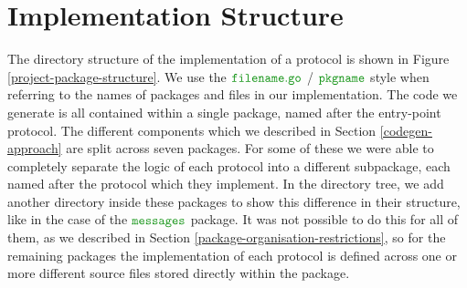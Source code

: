 \documentclass[12pt,twoside]{report}
\begin{document}


    

\section{Implementation Structure}\label{project-structure}

The directory structure of the implementation of a protocol is shown in Figure \ref{project-package-structure}. We use the $\filename{filename}$ / $\pkgname{pkgname}$ style when referring to the names of packages and files in our implementation. The code we generate is all contained within a single package, named after the entry-point protocol. The different components which we described in Section \ref{codegen-approach} are split across seven packages. For some of these we were able to completely separate the logic of each protocol into a different subpackage, each named after the protocol which they implement. In the directory tree, we add another directory inside these packages to show this difference in their structure, like in the case of the $\pkgname{messages}$ package. It was not possible to do this for all of them, as we described in Section \ref{package-organisation-restrictions}, so for the remaining packages the implementation of each protocol is defined across one or more different source files stored directly within the package.\\
\end{document}

